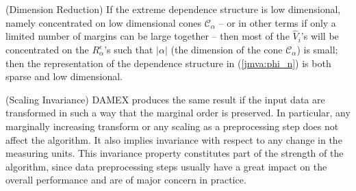 \begin{remark} ({\sc Dimension Reduction})
If the extreme dependence structure is low dimensional, namely
concentrated on low dimensional cones $\mathcal{C}_\alpha$ -- or in other terms if only a
limited number of margins can be large together -- then most of the
$\widehat V_i$'s will be concentrated on the $R_\alpha^\epsilon$'s
such that  $|\alpha|$ (the dimension of the cone $\mathcal{C}_\alpha$)
is small; then the
representation of the dependence structure
 in (\ref{jmva:phi_n}) is both sparse and low dimensional.
\end{remark}

\begin{remark} ({\sc Scaling Invariance})
DAMEX produces the same result if the input data are transformed in such a way that the marginal order is preserved. In particular, any marginally increasing transform or any scaling as a preprocessing step does not affect the algorithm. It also implies invariance with respect to any change in the measuring units. This invariance property constitutes part of the strength of the algorithm, since 
data preprocessing steps usually have a great impact on the overall performance and are of major concern in practice.
\end{remark}

